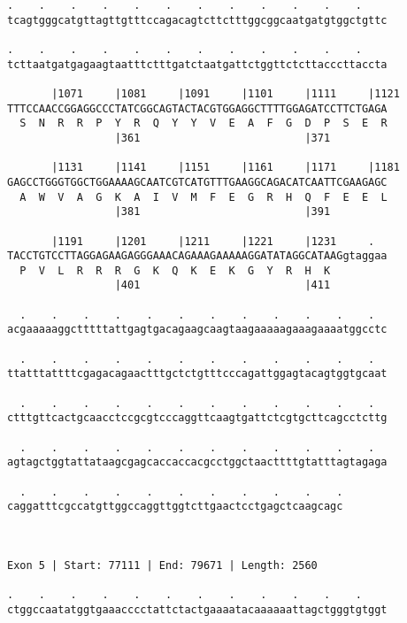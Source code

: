 \documentclass{article}
\begin{document}
\begin{Verbatim}
.    .    .    .    .    .    .    .    .    .    .    .    
tcagtgggcatgttagttgtttccagacagtcttctttggcggcaatgatgtggctgttc
                                                            
.    .    .    .    .    .    .    .    .    .    .    .    
tcttaatgatgagaagtaatttctttgatctaatgattctggttctcttacccttaccta
                                                            
       |1071     |1081     |1091     |1101     |1111     |1121
TTTCCAACCGGAGGCCCTATCGGCAGTACTACGTGGAGGCTTTTGGAGATCCTTCTGAGA
  S  N  R  R  P  Y  R  Q  Y  Y  V  E  A  F  G  D  P  S  E  R
                 |361                          |371         
  
       |1131     |1141     |1151     |1161     |1171     |1181
GAGCCTGGGTGGCTGGAAAAGCAATCGTCATGTTTGAAGGCAGACATCAATTCGAAGAGC
  A  W  V  A  G  K  A  I  V  M  F  E  G  R  H  Q  F  E  E  L
                 |381                          |391         
  
       |1191     |1201     |1211     |1221     |1231     .  
TACCTGTCCTTAGGAGAAGAGGGAAACAGAAAGAAAAAGGATATAGGCATAAGgtaggaa
  P  V  L  R  R  R  G  K  Q  K  E  K  G  Y  R  H  K         
                 |401                          |411         
  
  .    .    .    .    .    .    .    .    .    .    .    .  
acgaaaaaggctttttattgagtgacagaagcaagtaagaaaaagaaagaaaatggcctc
                                                            
  .    .    .    .    .    .    .    .    .    .    .    .  
ttatttattttcgagacagaactttgctctgtttcccagattggagtacagtggtgcaat
                                                            
  .    .    .    .    .    .    .    .    .    .    .    .  
ctttgttcactgcaacctccgcgtcccaggttcaagtgattctcgtgcttcagcctcttg
                                                            
  .    .    .    .    .    .    .    .    .    .    .    .  
agtagctggtattataagcgagcaccaccacgcctggctaacttttgtatttagtagaga
                                                            
  .    .    .    .    .    .    .    .    .    .    .
caggatttcgccatgttggccaggttggtcttgaactcctgagctcaagcagc
                                                     
                                                     
 
Exon 5 | Start: 77111 | End: 79671 | Length: 2560
 
.    .    .    .    .    .    .    .    .    .    .    .    
ctggccaatatggtgaaacccctattctactgaaaatacaaaaaattagctgggtgtggt
                                                            

\end{Verbatim}
\end{document}
